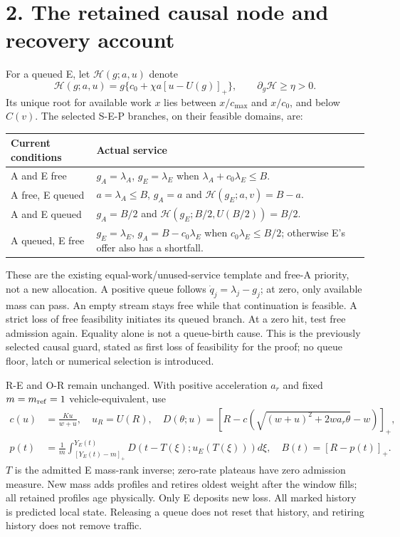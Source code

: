 \documentclass[11pt,a4paper]{article}
\newcommand{\pos}[1]{[#1]_+}
\begin{document}
\newpage
\section*{2. The retained causal node and recovery account}
For a queued E, let $\mathcal H(g;a,u)$ denote
\begin{equation}
 \mathcal H(g;a,u)=g\{c_0+\chi a\pos{u-U(g)}\},\qquad
 \partial_g\mathcal H\geq\eta>0.\tag{4}
\end{equation}
Its unique root for available work $x$ lies between
$x/c_{\max}$ and $x/c_0$, and below $C(v)$. The selected S-E-P
branches, on their feasible domains, are:
\begin{center}
\begin{tabular}{>{\raggedright\arraybackslash}p{28mm}>{\raggedright\arraybackslash}p{115mm}}
\toprule
Current conditions & Actual service\\
\midrule
A and E free & $g_A=\lambda_A$, $g_E=\lambda_E$ when
  $\lambda_A+c_0\lambda_E\leq B$.\\[3pt]
A free, E queued & $a=\lambda_A\leq B$, $g_A=a$ and
  $\mathcal H(g_E;a,v)=B-a$.\\[3pt]
A and E queued & $g_A=B/2$ and
  $\mathcal H(g_E;B/2,U(B/2))=B/2$.\\[3pt]
A queued, E free & $g_E=\lambda_E$, $g_A=B-c_0\lambda_E$ when
  $c_0\lambda_E\leq B/2$; otherwise E's offer also has a shortfall.\\
\bottomrule
\end{tabular}
\end{center}
These are the existing equal-work/unused-service template and free-A
priority, not a new allocation. A positive queue follows
$\dot q_j=\lambda_j-g_j$; at zero, only available mass can pass.
An empty stream stays free while that continuation is feasible. A strict
loss of free feasibility initiates its queued branch. At a zero hit, test
free admission again. Equality alone is not a queue-birth cause. This is
the previously selected causal guard, stated as first loss of feasibility
for the proof; no queue floor, latch or numerical selection is introduced.

R-E and O-R remain unchanged. With positive acceleration $a_r$ and fixed
$m=m_{\rm ref}=1$ vehicle-equivalent, use
\begin{align}
 c(u)&=\frac{Ku}{w+u},\quad u_R=U(R),\quad
 D(\theta;u)=\pos{R-c(\sqrt{(w+u)^2+2wa_r\theta}-w)},\nonumber\\
 p(t)&=\frac1m\int_{[Y_E(t)-m]_+}^{Y_E(t)}
       D(t-T(\xi);u_E(T(\xi)))d\xi,\quad B(t)=\pos{R-p(t)}.\tag{5}
\end{align}
$T$ is the admitted E mass-rank inverse; zero-rate plateaus have zero
admission measure. New mass adds profiles and retires oldest weight after
the window fills; all retained profiles age physically. Only E deposits
new loss. All marked history is predicted local state. Releasing a queue
does not reset that history, and retiring history does not remove traffic.
\end{document}
